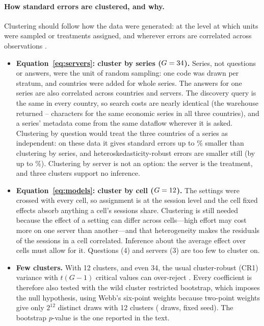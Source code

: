 \documentclass[11pt,a4paper]{article}
\begin{document}
\paragraph{How standard errors are clustered, and why.} Clustering should follow how the data were generated: at the level at which units were sampled or treatments assigned, and wherever errors are correlated across observations \citep{abadie2023,mackinnon2023}.
\begin{itemize}
\item \textbf{Equation~\eqref{eq:servers}: cluster by series ($G=34$).} Series, not questions or answers, were the unit of random sampling: one code was drawn per stratum, and countries were added for whole series. The answers for one series are also correlated across countries and servers. The discovery query is the same in every country, so search costs are nearly identical (the warehouse returned \sameSeriesMin--\sameSeriesMax{} characters for the same economic series in all three countries), and a series' metadata come from the same dataflow wherever it is asked. Clustering by question would treat the three countries of a series as independent: on these data it gives standard errors up to \efSeVsQ\% smaller than clustering by series, and heteroskedasticity-robust errors are smaller still (by up to \efSeVsHc\%). Clustering by server is not an option: the server is the treatment, and three clusters support no inference.
\item \textbf{Equation~\eqref{eq:models}: cluster by cell ($G=12$).} The settings were crossed with every cell, so assignment is at the session level and the cell fixed effects absorb anything a cell's sessions share. Clustering is still needed because the effect of a setting can differ across cells---high effort may cost more on one server than another---and that heterogeneity makes the residuals of the sessions in a cell correlated. Inference about the average effect over cells must allow for it. Questions (4) and servers (3) are too few to cluster on.
\item \textbf{Few clusters.} With 12 clusters, and even 34, the usual cluster-robust (CR1) variance with $t(G-1)$ critical values can over-reject \citep{cameron2008,mackinnon2017}. Every coefficient is therefore also tested with the wild cluster restricted bootstrap, which imposes the null hypothesis, using Webb's six-point weights \citep{webb2023} because two-point weights give only $2^{12}$ distinct draws with 12 clusters (\efBoot{} draws, fixed seed). The bootstrap $p$-value is the one reported in the text.
\end{itemize}
\end{document}
